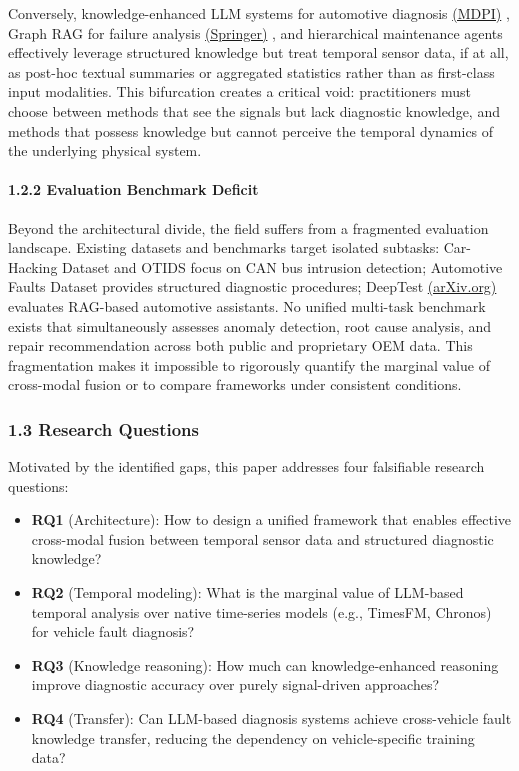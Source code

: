 \documentclass[
  11pt,
]{article}
\providecommand{\tightlist}{%
  \setlength{\itemsep}{0pt}\setlength{\parskip}{0pt}}
\begin{document}
Conversely, knowledge-enhanced LLM systems for automotive diagnosis
\href{https://www.mdpi.com/2079-9292/14/21/4180}{(MDPI)} , Graph RAG for
failure analysis
\href{https://link.springer.com/article/10.1007/s10791-025-09823-8}{(Springer)}
, and hierarchical maintenance agents effectively leverage structured
knowledge but treat temporal sensor data, if at all, as post-hoc textual
summaries or aggregated statistics rather than as first-class input
modalities. This bifurcation creates a critical void: practitioners must
choose between methods that see the signals but lack diagnostic
knowledge, and methods that possess knowledge but cannot perceive the
temporal dynamics of the underlying physical system.

\paragraph{1.2.2 Evaluation Benchmark
Deficit}\label{evaluation-benchmark-deficit}

Beyond the architectural divide, the field suffers from a fragmented
evaluation landscape. Existing datasets and benchmarks target isolated
subtasks: Car-Hacking Dataset and OTIDS focus on CAN bus intrusion
detection; Automotive Faults Dataset provides structured diagnostic
procedures; DeepTest
\href{https://arxiv.org/html/2604.12615v1}{(arXiv.org)} evaluates
RAG-based automotive assistants. No unified multi-task benchmark exists
that simultaneously assesses anomaly detection, root cause analysis, and
repair recommendation across both public and proprietary OEM data. This
fragmentation makes it impossible to rigorously quantify the marginal
value of cross-modal fusion or to compare frameworks under consistent
conditions.

\subsubsection{1.3 Research Questions}\label{research-questions}

Motivated by the identified gaps, this paper addresses four falsifiable
research questions:

\begin{itemize}
\tightlist
\item
  \textbf{RQ1} (Architecture): How to design a unified framework that
  enables effective cross-modal fusion between temporal sensor data and
  structured diagnostic knowledge?
\item
  \textbf{RQ2} (Temporal modeling): What is the marginal value of
  LLM-based temporal analysis over native time-series models (e.g.,
  TimesFM, Chronos) for vehicle fault diagnosis?
\item
  \textbf{RQ3} (Knowledge reasoning): How much can knowledge-enhanced
  reasoning improve diagnostic accuracy over purely signal-driven
  approaches?
\item
  \textbf{RQ4} (Transfer): Can LLM-based diagnosis systems achieve
  cross-vehicle fault knowledge transfer, reducing the dependency on
  vehicle-specific training data?
\end{itemize}
\end{document}
